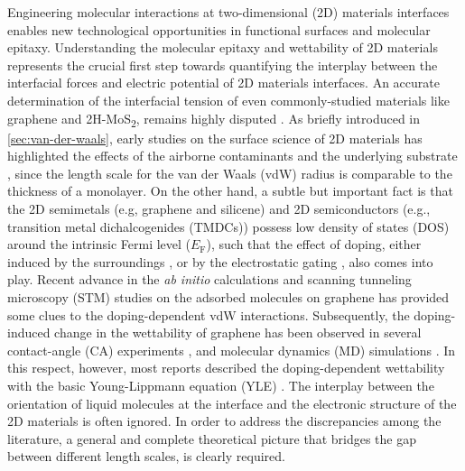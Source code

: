 Engineering molecular interactions at two-dimensional (2D) materials
interfaces enables new technological opportunities in functional
surfaces and molecular epitaxy.
%
Understanding the molecular epitaxy and wettability of 2D
materials represents the crucial first step towards quantifying the
interplay between the interfacial forces and electric potential of 2D
materials interfaces.
%
An accurate determination of the interfacial tension of even
commonly-studied materials like graphene and 2H-MoS\textsubscript{2},
remains highly disputed
\cite{taherian2013what,Kozbial_2015_wetting_mos2,Parobek_2015_wetting_rev,Govind_Rajan_2016}.
%
As briefly introduced in \autoref{sec:van-der-waals}, early studies on
the surface science of 2D materials has highlighted the effects of the
airborne contaminants
\cite{li_2013_airborne,Xu_2013_withwhat,Kozbial_study_2014_gr_wetting,Kozbial_2015_wetting_mos2,Chow_2015_wetting_WS2}
and the underlying substrate
\cite{Raj_2013_wetting_rev,rafiee_2012_transparency,Shih_2012_prl,shih_2013_wetting_natmat},
since the length scale for the van der Waals (vdW) radius is
comparable to the thickness of a monolayer. On the other hand, a
subtle but important fact is that the 2D semimetals (e.g, graphene and
silicene) and 2D semiconductors (e.g., transition metal
dichalcogenides (TMDCs)) possess low density of states (DOS) around
the intrinsic Fermi level (\(E_{\mathrm{F}}\)), such that the effect
of doping, either induced by the surroundings
\cite{Chen_2013_doping,Varchon_2007_elec_struc_gr_SiC,Giovannetti_2008_doping},
or by the electrostatic gating
\cite{Das_2008_doping,Perera_2013_doping}, also comes into
play. Recent advance in the \textit{ab initio} calculations and
scanning tunneling microscopy (STM) studies on the adsorbed molecules
on graphene
\cite{Muruganathan_2015_tunable_vdw_gr,Huttmann_2015_vdw_gr_doping}
has provided some clues to the doping-dependent vdW
interactions. Subsequently, the doping-induced change in the
wettability of graphene has been observed in several contact-angle (CA)
experiments
\cite{Hong_2016_mechanism,goniszewski_correlation_2016,Ashraf_2016_doping},
and molecular dynamics (MD) simulations
\cite{Ostrowski_2014_tunable,Ren_2015_interfacial,Taherian_2015_asym_EW,Daub_2007_nanoscale_EW}.
%
In this respect, however, most reports described the doping-dependent
wettability with the basic Young-Lippmann equation (YLE)
\cite{Lippmann_1875_wetting}. The interplay between the orientation of
liquid molecules at the interface \cite{Shen_2006_lifshitz_water} and
the electronic structure of the 2D materials is often ignored. In
order to address the discrepancies among the literature, a general and
complete theoretical picture that bridges the gap between different
length scales, is clearly required.



